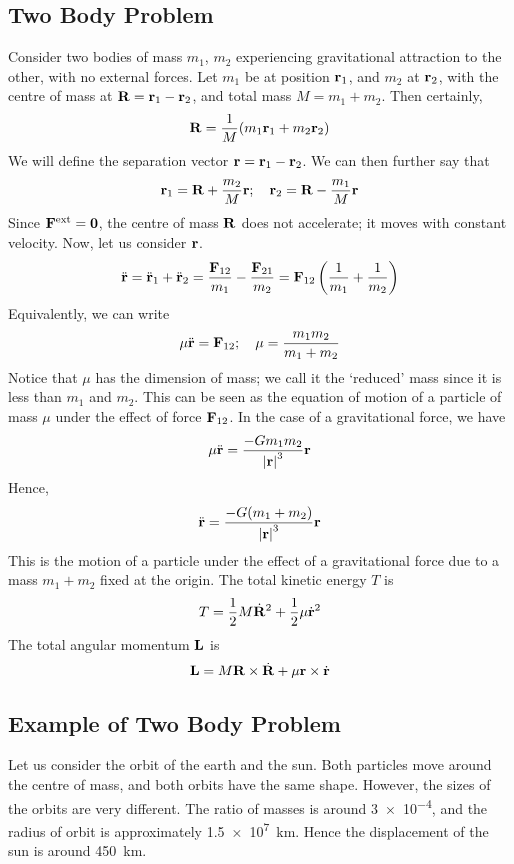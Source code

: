 \subsection{Two Body Problem}
Consider two bodies of mass \(m_1\), \(m_2\) experiencing gravitational attraction to the other, with no external forces.
Let \(m_1\) be at position \(\vb r_1\), and \(m_2\) at \(\vb r_2\), with the centre of mass at \(\vb R = \vb r_1 - \vb r_2\), and total mass \(M = m_1 + m_2\).
Then certainly,
\[
	\vb R = \frac{1}{M}(m_1 \vb r_1 + m_2 \vb r_2)
\]
We will define the separation vector \(\vb r = \vb r_1 - \vb r_2\).
We can then further say that
\[
	\vb r_1 = \vb R + \frac{m_2}{M}\vb r;\quad \vb r_2 = \vb R - \frac{m_1}{M}\vb r
\]
Since \(\vb F^\text{ext} = \vb 0\), the centre of mass \(\vb R\) does not accelerate; it moves with constant velocity.
Now, let us consider \(\vb r\).
\[
	\ddot{\vb{r}} = \ddot{\vb{r}}_1 + \ddot{\vb{r}}_2 = \frac{\vb F_{12}}{m_1} - \frac{\vb F_{21}}{m_2} = \vb F_{12} \left( \frac{1}{m_1} + \frac{1}{m_2} \right)
\]
Equivalently, we can write
\[
	\mu\ddot{\vb{r}} = \vb F_{12};\quad \mu = \frac{m_1 m_2}{m_1 + m_2}
\]
Notice that \(\mu\) has the dimension of mass; we call it the `reduced' mass since it is less than \(m_1\) and \(m_2\).
This can be seen as the equation of motion of a particle of mass \(\mu\) under the effect of force \(\vb F_{12}\).
In the case of a gravitational force, we have
\[
	\mu \ddot{\vb{r}} = \frac{-Gm_1m_2}{\abs{\vb r}^3}\vb r
\]
Hence,
\[
	\ddot{\vb{r}} = \frac{-G(m_1 + m_2)}{\abs{\vb r}^3}\vb r
\]
This is the motion of a particle under the effect of a gravitational force due to a mass \(m_1 + m_2\) fixed at the origin.
The total kinetic energy \(T\) is
\[
	T = \frac{1}{2}M\dot {\vb R}^2 + \frac{1}{2}\mu \dot{\vb{r}}^2
\]
The total angular momentum \(\vb L\) is
\[
	\vb L = M \vb R \times \dot{\vb R} + \mu \vb r \times \dot{\vb r}
\]

\subsection{Example of Two Body Problem}
Let us consider the orbit of the earth and the sun.
Both particles move around the centre of mass, and both orbits have the same shape.
However, the sizes of the orbits are very different.
The ratio of masses is around \num{3e-4}, and the radius of orbit is approximately \SI{1.5e7}{\kilo\metre}.
Hence the displacement of the sun is around \SI{450}{\kilo\metre}.

